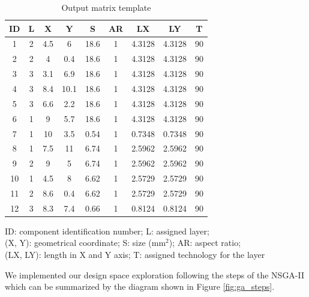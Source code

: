 \begin{table}[h!]
\caption{Output matrix template}
\begin{center}
\begin{scriptsize}
\begin{tabular}{|c|c|c|c|c|c|c|c|c|}
\hline ID & L & X & Y & S & AR & LX & LY & T\\
\hline 1 & 2 & 4.5 & 6 & 18.6 & 1 & 4.3128 & 4.3128 & 90\\
2 & 2 & 4 & 0.4 & 18.6 & 1 & 4.3128 & 4.3128 & 90\\
3 & 3 & 3.1 & 6.9 & 18.6 & 1 & 4.3128 & 4.3128 & 90\\
4 & 3 & 8.4 & 10.1 & 18.6 & 1 & 4.3128 & 4.3128 & 90\\
5 & 3 & 6.6 & 2.2 & 18.6 & 1 & 4.3128 & 4.3128 & 90\\
6 & 1 & 9 & 5.7 & 18.6 & 1 & 4.3128 & 4.3128 & 90\\
7 & 1 & 10 & 3.5 & 0.54 & 1 & 0.7348 & 0.7348 & 90\\
8 & 1 & 7.5 & 11 & 6.74 & 1 & 2.5962 & 2.5962 & 90\\
9 & 2 & 9 & 5 & 6.74 & 1 & 2.5962 & 2.5962 & 90\\
10 & 1 & 4.5 & 8 & 6.62 & 1 & 2.5729 & 2.5729 & 90\\
11 & 2 & 8.6 & 0.4 & 6.62 & 1 & 2.5729 & 2.5729 & 90\\
12 & 3 & 8.3 & 7.4 & 0.66 & 1 & 0.8124 & 0.8124 & 90\\
\hline
\end{tabular}
\end{scriptsize}
\end{center}
\begin{center}
\begin{scriptsize}
ID: component identification number; L: assigned layer;\\
(X, Y): geometrical coordinate; S: size (mm$^2$); AR: aspect ratio;\\
(LX, LY): length in X and Y axis; T: assigned technology for the layer
\end{scriptsize}
\end{center}
\label{tab:outputmat}
\end{table}

We implemented our design space exploration following the steps of the NSGA-II which can be summarized by the diagram shown in Figure \ref{fig:ga_steps}.

